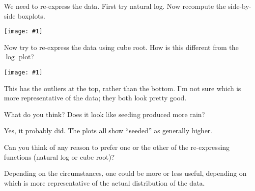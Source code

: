 \documentclass[12pt,letterpaper]{hmcpset}
\newcommand{\image}[1]{\begin{center}\texttt{[image: \#1]}\end{center}}
\begin{document}
\begin{problem}[e]

    We need to re-express the data. First try natural log. Now recompute the side-by-side boxplots.

\end{problem}

\begin{solution}
	\image{oct27g4}
\end{solution}
\newpage

\begin{problem}[$\text{e}_2$]

     Now try to re-express the data using cube root. How is this different from the $\log$ plot?

\end{problem}

\begin{solution}
	\image{oct27g5}
	
	This has the outliers at the top, rather than the bottom.  I'm not sure which is more representative of the data; they both look pretty good.
\end{solution}
\newpage

\begin{problem}[f]

    What do you think? Does it look like seeding produced more rain?

\end{problem}

\begin{solution}
	Yes, it probably did. The plots all show ``seeded'' as generally higher.
\end{solution}
\newpage

\begin{problem}[g]

     Can you think of any reason to prefer one or the other of the re-expressing functions (natural log or cube root)?

\end{problem}

\begin{solution}
	Depending on the circumstances, one could be more or less useful, depending on which is more representative of the actual distribution of the data. 
\end{solution}
\end{document}
